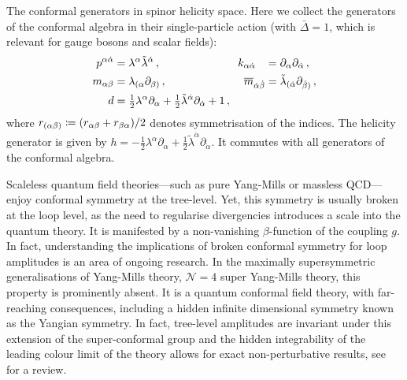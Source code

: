 \begin{important}{The conformal generators in spinor helicity space.}
Here we collect the generators of the conformal algebra in their single-particle action (with $\bar\Delta=1$, which is relevant for gauge bosons and scalar fields):
\begin{align}
\label{spinhelconfalg}
%
\begin{alignedat}{2}
p^{\alpha \dot{\alpha} } &= \lambda^{\alpha} {\tilde\lambda}^{\dot{\alpha}} \,, \qquad \qquad \qquad \quad
  k_{\alpha \dot{\alpha}} && = \partial_{\alpha} \partial_{\dot{\alpha}} \,, \\
%
m_{\alpha \beta} &= \lambda_{( \alpha} \partial_{\beta ) } \,,\qquad \qquad \qquad \quad
  \overline{m}_{ \dot{\alpha} \dot{\beta} } && = \tilde{\lambda}_{( \dot{\alpha}}  \partial_{\dot{\beta})} \,, \\
%
d & = \ft{1}{2} \lambda^{\alpha} \partial_\alpha + \ft{1}{2} \tilde{\lambda}^{\dot{\alpha}} \partial_{\dot{\alpha}} + 1 \,, && \\
\end{alignedat} 
\end{align} 
where $r_{(\alpha\beta)} \coloneqq (r_{\alpha\beta} + r_{\beta\alpha})/2$ denotes symmetrisation of the indices.
The helicity generator is given by $h= -\frac{1}{2} \lambda^{\alpha} \partial_\alpha + \frac{1}{2} \tilde{\lambda}^{\dot{\alpha}} \partial_{\dot{\alpha}}$. It commutes with all generators of the conformal algebra.
\end{important}
%
Scaleless quantum field theories---such as pure Yang-Mills or massless QCD---enjoy conformal 
symmetry at the tree-level. Yet, this symmetry is usually broken at the loop level, as the need to regularise divergencies introduces a scale into the quantum theory. 
It is manifested by a non-vanishing $\beta$-function of the coupling $g$.
In fact,  
understanding the implications of broken conformal symmetry for loop amplitudes is an area of ongoing research. In the maximally supersymmetric generalisations of Yang-Mills theory,
$\mathcal{N}=4$ super Yang-Mills theory, this property is prominently absent. It is a quantum conformal
field theory, with far-reaching consequences, including a hidden infinite dimensional
symmetry known as the Yangian symmetry. In fact, tree-level amplitudes are invariant
under this extension of the super-conformal group \cite{ch2_Drummond:2009fd} and the
hidden integrability of the leading colour limit of the theory allows for exact
non-perturbative results, see~\cite{ch2_Beisert:2010jr} for a review.

